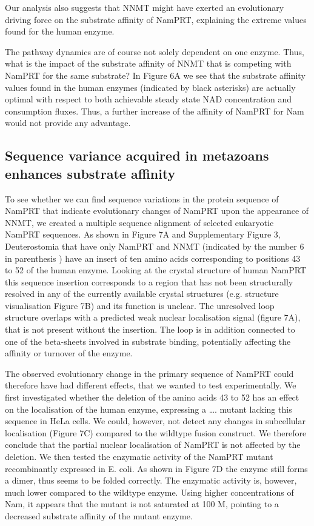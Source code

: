 Our analysis also suggests that NNMT might have exerted an evolutionary driving force on the substrate affinity of NamPRT, explaining the extreme values found for the human enzyme.

The pathway dynamics are of course not solely dependent on one enzyme. Thus, what is the impact of the substrate affinity of NNMT that is competing with NamPRT for the same substrate? In Figure 6A we see that the substrate affinity values found in the human enzymes (indicated by black asterisks) are actually optimal with respect to both achievable steady state NAD concentration and consumption fluxes. Thus, a further increase of the affinity of NamPRT for Nam would not provide any advantage.


\subsection{Sequence variance acquired in metazoans enhances substrate affinity}

To see whether we can find sequence variations in the protein sequence of NamPRT that indicate evolutionary changes of NamPRT upon the appearance of NNMT, we created a multiple sequence alignment of selected eukaryotic NamPRT sequences. As shown in Figure 7A and Supplementary Figure 3, Deuterostomia that have only NamPRT and NNMT (indicated by the number 6 in parenthesis ) have an insert of ten amino acids corresponding to positions 43 to 52 of the human enzyme. Looking at the crystal structure of human NamPRT this sequence insertion corresponds to a region that has not been structurally resolved in any of the currently available crystal structures (e.g. \cite{Wang2006} structure visualisation Figure 7B) and its function is unclear. The unresolved loop structure overlaps with a predicted weak nuclear localisation signal (figure 7A), that is not present without the insertion. The loop is in addition connected to one of the beta-sheets involved in substrate binding, potentially affecting the affinity or turnover of the enzyme.

The observed evolutionary change in the primary sequence of NamPRT could therefore have had different effects, that we wanted to test experimentally. We first investigated whether the deletion of the amino acids 43 to 52 has an effect on the localisation of the human enzyme, expressing a …. mutant lacking this sequence in HeLa cells. We could, however, not detect any changes in subcellular localisation (Figure 7C) compared to the wildtype fusion construct. We therefore conclude that the partial nuclear localisation of NamPRT is not affected by the deletion. We then tested the enzymatic activity of the NamPRT mutant recombinantly expressed in E. coli. As shown in Figure 7D the enzyme still forms a dimer, thus seems to be folded correctly. The enzymatic activity is, however, much lower compared to the wildtype enzyme. Using higher concentrations of Nam, it appears that the mutant is not saturated at 100 \textmu M, pointing to a decreased substrate affinity of the mutant enzyme.
